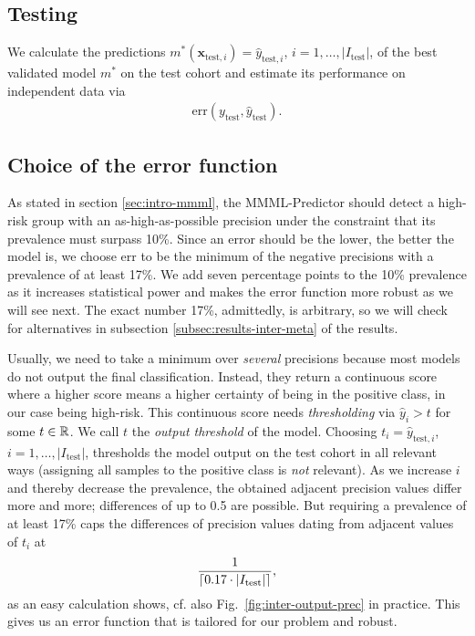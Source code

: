 \subsection{Testing}

We calculate the predictions $m^*(\mathbf{x}_{\text{test}, i}) = \hat{y}_{\text{test}, i}$, $i = 
1, \ldots, |I_\text{test}|$, of the 
best validated model $m^*$ on the test cohort and estimate its performance on independent data via 
\begin{align}
    \text{err}(y_\text{test}, \hat{y}_\text{test}).
\end{align}

\subsection{Choice of the error function}\label{subsec:error-function}

As stated in section \ref{sec:intro-mmml}, the MMML-Predictor should detect a high-risk group 
with an as-high-as-possible precision under the constraint that its prevalence must surpass 
\num{10}\%. Since an error should be the lower, the better the model is, we choose 
$\text{err}$ to be the minimum of the negative precisions with a prevalence of at least \num{17}\%. We 
add seven percentage points to the \num{10}\% prevalence as it increases statistical power and makes 
the error function more robust as we will see next. The exact number \num{17}\%, admittedly, is 
arbitrary, so we will check for alternatives in subsection \ref{subsec:results-inter-meta} of the 
results.

Usually, we need 
to take a minimum over \textit{several} precisions because most models do not output the final 
classification.
Instead, they return a continuous score where a higher score means a higher certainty of being
in the positive class, in our case being high-risk. This continuous score needs 
\textit{thresholding} via $\hat{y}_i > t$ for some $t \in \RR$. We call $t$ the \textit{output
threshold} of the model. Choosing $t_i = \hat{y}_{\text{test}, i}$, $i = 1, \ldots, |I_\text{test}|$, 
thresholds the model output on the test cohort in all relevant ways (assigning all samples to the 
positive class is \textit{not} relevant).
As we increase $i$ and thereby decrease the prevalence, the obtained 
adjacent precision values differ more and more; differences of up to \num{0.5}
are possible. But requiring a prevalence of at least 17\% caps the differences of precision 
values dating from adjacent values of $t_i$ at
\begin{align}
    \frac{1}{\ceil*{\num{0.17} \cdot |I_\text{test}|}},
\end{align}
as an easy calculation shows, cf. also Fig.\ 
\ref{fig:inter-output-prec} in practice. This gives us an error function that is tailored 
for our problem and robust.

